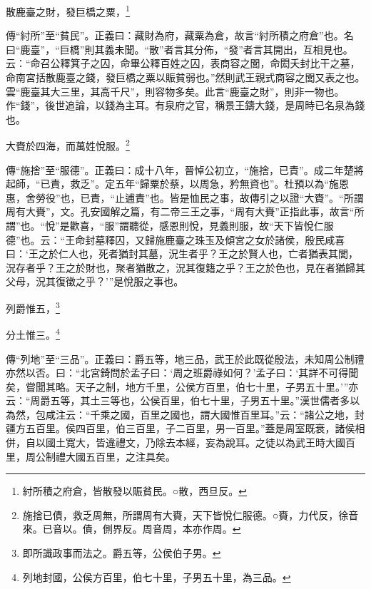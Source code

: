 散鹿臺之財，發巨橋之粟，\footnote{紂所積之府倉，皆散發以賑貧民。○散，西旦反。}

{\noindent\zhuan{}\fzbyks 傳“紂所”至“貧民”。正義曰：藏財為府，藏粟為倉，故言“紂所積之府倉”也。名曰“鹿臺”，“巨橋”則其義未聞。“散”者言其分佈，“發”者言其開出，互相見也。云：“命召公釋箕子之囚，命畢公釋百姓之囚，表商容之閭，命閎夭封比干之墓，命南宮括散鹿臺之錢，發巨橋之粟以賑貧弱也。”然則武王親式商容之閭又表之也。雲“鹿臺其大三里，其高千尺”，則容物多矣。此言“鹿臺之財”，則非一物也。作“錢”，後世追論，以錢為主耳。有泉府之官，稱景王鑄大錢，是周時已名泉為錢也。 \par}

大賚於四海，而萬姓悅服。\footnote{施捨已債，救乏周無，所謂周有大賚，天下皆悅仁服德。○賚，力代反，徐音來。已音以。債，側界反。周音周，本亦作周。}

{\noindent\zhuan{}\fzbyks 傳“施捨”至“服德”。正義曰：成十八年，晉悼公初立，“施捨，已責”。成二年楚將起師，“已責，救乏”。定五年“歸粟於蔡，以周急，矜無資也”。杜預以為“施恩惠，舍勞役”也，已責，“止逋責”也。皆是恤民之事，故傳引之以證“大賚”。“所謂周有大賚”，文。孔安國解之篇，有二帝三王之事，“周有大賚”正指此事，故言“所謂”也。“悅”是歡喜，“服”謂聽從，感恩則悅，見義則服，故“天下皆悅仁服德”也。云：“王命封墓釋囚，又歸施鹿臺之珠玉及傾宮之女於諸侯，殷民咸喜曰：‘王之於仁人也，死者猶封其墓，況生者乎？王之於賢人也，亡者猶表其閭，況存者乎？王之於財也，聚者猶散之，況其復籍之乎？王之於色也，見在者猶歸其父母，況其復徵之乎？’”是悅服之事也。 \par}

列爵惟五，\footnote{即所識政事而法之。爵五等，公侯伯子男。}

分土惟三。\footnote{列地封國，公侯方百里，伯七十里，子男五十里，為三品。}

{\noindent\zhuan{}\fzbyks 傳“列地”至“三品”。正義曰：爵五等，地三品，武王於此既從殷法，未知周公制禮亦然以否。曰：“北宮錡問於孟子曰：‘周之班爵祿如何？’孟子曰：‘其詳不可得聞矣，嘗聞其略。天子之制，地方千里，公侯方百里，伯七十里，子男五十里。’”亦云：“周爵五等，其土三等也，公侯百里，伯七十里，子男五十里。”漢世儒者多以為然，包咸注云：“千乘之國，百里之國也，謂大國惟百里耳。”云：“諸公之地，封疆方五百里。侯四百里，伯三百里，子二百里，男一百里。”蓋是周室既衰，諸侯相併，自以國土寬大，皆違禮文，乃除去本經，妄為說耳。之徒以為武王時大國百里，周公制禮大國五百里，之注具矣。 \par}

